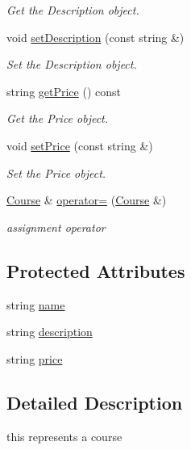 \begin{DoxyCompactItemize}
\begin{DoxyCompactList}\small\item\em Get the Description object. \end{DoxyCompactList}\item 
void \hyperlink{classCourseImpl_a38d1a7f80f078828f9f2795aa4219e91}{set\+Description} (const string \&)
\begin{DoxyCompactList}\small\item\em Set the Description object. \end{DoxyCompactList}\item 
string \hyperlink{classCourseImpl_a0b7ff83c24bd1d8e7a6d10b6b89883cd}{get\+Price} () const
\begin{DoxyCompactList}\small\item\em Get the Price object. \end{DoxyCompactList}\item 
void \hyperlink{classCourseImpl_a83623c7a5eff0d028151e4d2126884de}{set\+Price} (const string \&)
\begin{DoxyCompactList}\small\item\em Set the Price object. \end{DoxyCompactList}\item 
\hyperlink{classCourse}{Course} \& \hyperlink{classCourseImpl_a2a35e597103c55fd43b68e78c76952e6}{operator=} (\hyperlink{classCourse}{Course} \&)
\begin{DoxyCompactList}\small\item\em assignment operator \end{DoxyCompactList}\end{DoxyCompactItemize}
\subsection*{Protected Attributes}
\begin{DoxyCompactItemize}
\item 
string \hyperlink{classCourseImpl_a1889e262381ed6f13aa57ad116f050e7}{name}
\item 
string \hyperlink{classCourseImpl_aaf5d0d4c16bc2d0403f0baae29b7600c}{description}
\item 
string \hyperlink{classCourseImpl_a1599d100a1c5a01277e28e8777c03666}{price}
\end{DoxyCompactItemize}


\subsection{Detailed Description}
this represents a course 

